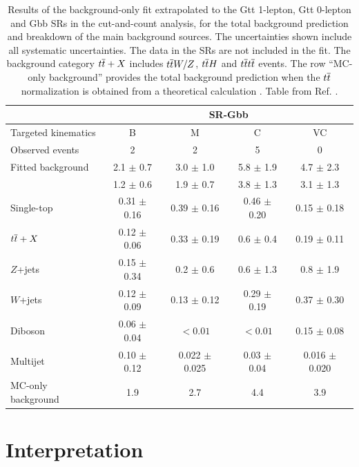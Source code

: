 \begin{table}[htbp]
	\begin{tabular}{lcccc}
		\toprule
		& \multicolumn{4}{c}{SR-Gbb} \\
		\midrule
          Targeted kinematics & B            	&   	M   		&   C   &   VC                \\[-0.05cm]
		\midrule
		Observed events              & 2 & 2 & 5 & 0\\
		\midrule
		Fitted background           &   2.1 $\pm$ 0.7 & 3.0 $\pm$ 1.0 & 5.8 $\pm$ 1.9 & 4.7 $\pm$ 2.3\\
		\midrule
		\ttbar\            			& 1.2 $\pm$ 0.6 & 1.9 $\pm$ 0.7 & 3.8 $\pm$ 1.3 & 3.1 $\pm$ 1.3\\
		Single-top             		& 0.31 $\pm$ 0.16 & 0.39 $\pm$ 0.16 & 0.46 $\pm$ 0.20 & 0.15 $\pm$ 0.18\\
		$t\overline{t}+X$             		& 0.12 $\pm$ 0.06 & 0.33 $\pm$ 0.19 & 0.6 $\pm$ 0.4 & 0.19 $\pm$ 0.11\\
		$Z$+jets             		& 0.15 $\pm$ 0.34 & 0.2 $\pm$ 0.6 & 0.6 $\pm$ 1.3 & 0.8 $\pm$ 1.9\\
		$W$+jets             		& 0.12 $\pm$ 0.09 & 0.13 $\pm$ 0.12 & 0.29 $\pm$ 0.19 & 0.37 $\pm$ 0.30\\
		Diboson             		& 0.06 $\pm$ 0.04 & $<0.01$ & $<0.01$ & 0.15 $\pm$ 0.08\\
                Multijet              & 0.10 $\pm$ 0.12 & 0.022 $\pm$ 0.025 & 0.03 $\pm$ 0.04 & 0.016 $\pm$ 0.020\\
		 \midrule
 		MC-only background & 1.9 & 2.7 & 4.4 & 3.9  \\  
		\bottomrule
	\end{tabular}
\caption{Results of the background-only fit extrapolated to the Gtt 1-lepton, Gtt 0-lepton and Gbb SRs in
	the cut-and-count analysis, for the total background prediction and breakdown of the main background sources. 
	The uncertainties shown include all systematic uncertainties. The data in the SRs are not included in the fit. 
	The background category $t\overline{t}+X$ includes $t\overline{t} W/Z$, $t\overline{t} H$ and $t\overline{t} t\overline{t}$ events.
	The row ``MC-only background'' provides the total background prediction when the
	$t\overline{t}$ normalization is obtained from a theoretical
	calculation \cite{Czakon:2011xx}.  Table from Ref. \cite{Aaboud:2017hrg}.
	}
	\label{tab:yield_discovery}
\end{table}


\FloatBarrier

\section{Interpretation}
\label{sec:strongprod:limits}

